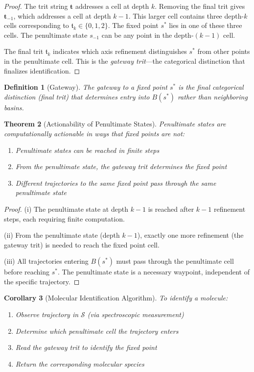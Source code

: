 \documentclass[twocolumn,10pt,a4paper]{article}
\newtheorem{theorem}{Theorem}[section]
\newtheorem{corollary}[theorem]{Corollary}
\newtheorem{definition}[theorem]{Definition}
\newcommand{\Sspace}{\mathcal{S}}
\newcommand{\trit}{\mathfrak{t}}
\begin{document}
\begin{proof}
The trit string $\mathbf{t}$ addresses a cell at depth $k$. Removing the final trit gives $\mathbf{t}_{-1}$, which addresses a cell at depth $k-1$. This larger cell contains three depth-$k$ cells corresponding to $\trit_k \in \{0, 1, 2\}$. The fixed point $s^*$ lies in one of these three cells. The penultimate state $s_{-1}$ can be any point in the depth-$(k-1)$ cell.

The final trit $\trit_k$ indicates which axis refinement distinguishes $s^*$ from other points in the penultimate cell. This is the \emph{gateway trit}---the categorical distinction that finalizes identification.
\end{proof}

\begin{definition}[Gateway]
The \emph{gateway} to a fixed point $s^*$ is the final categorical distinction (final trit) that determines entry into $B(s^*)$ rather than neighboring basins.
\end{definition}

\begin{theorem}[Actionability of Penultimate States]
\label{thm:actionable}
Penultimate states are computationally actionable in ways that fixed points are not:
\begin{enumerate}[label=(\roman*)]
    \item Penultimate states can be reached in finite steps
    \item From the penultimate state, the gateway trit determines the fixed point
    \item Different trajectories to the same fixed point pass through the same penultimate state
\end{enumerate}
\end{theorem}

\begin{proof}
(i) The penultimate state at depth $k-1$ is reached after $k-1$ refinement steps, each requiring finite computation.

(ii) From the penultimate state (depth $k-1$), exactly one more refinement (the gateway trit) is needed to reach the fixed point cell.

(iii) All trajectories entering $B(s^*)$ must pass through the penultimate cell before reaching $s^*$. The penultimate state is a necessary waypoint, independent of the specific trajectory.
\end{proof}

\begin{corollary}[Molecular Identification Algorithm]
To identify a molecule:
\begin{enumerate}
    \item Observe trajectory in $\Sspace$ (via spectroscopic measurement)
    \item Determine which penultimate cell the trajectory enters
    \item Read the gateway trit to identify the fixed point
    \item Return the corresponding molecular species
\end{enumerate}
\end{corollary}
\end{document}
